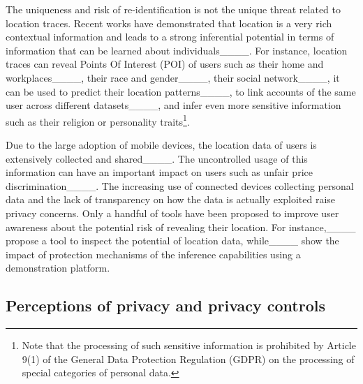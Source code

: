 The uniqueness and risk of re-identification is not the unique threat related to location traces.
Recent works have demonstrated that location is a very rich contextual information and leads to a strong inferential potential in terms of information that can be learned about individuals____. 
For instance, location traces can reveal Points Of Interest (POI) of users such as their home and workplaces____, their race and gender____, their social network____, it can be used to predict their location patterns____, to link accounts of the same user across different datasets____, and infer even more sensitive information such as their religion or personality traits\footnote{Note that the processing of such sensitive information is prohibited by Article 9(1) of the General Data Protection Regulation (GDPR) on the processing of special categories of personal data.}.

Due to the large adoption of mobile devices, the location data of users is extensively collected and shared____.
The uncontrolled usage of this information can have an important impact on users such as unfair price discrimination____.
The increasing use of connected devices collecting personal data and the lack of transparency on how the data is actually exploited raise privacy concerns.
Only a handful of tools have been proposed to improve user awareness about the potential risk of revealing their location.
For instance,____ propose a tool to inspect the potential of location data, while____ show the impact of protection mechanisms of the inference capabilities using a demonstration platform.

\subsection{Perceptions of privacy and privacy controls}
\label{sec:relatedPerception}

